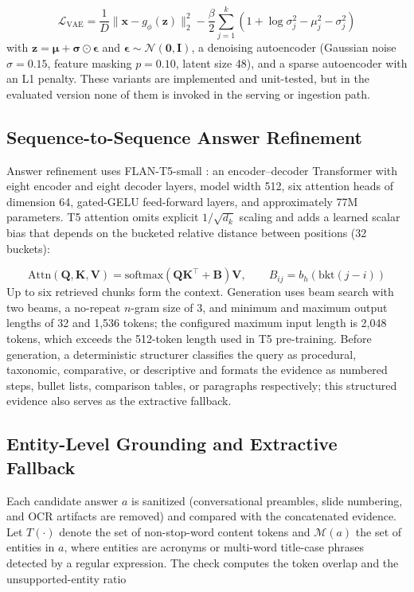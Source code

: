 \documentclass[conference]{IEEEtran}
\renewcommand{\boldsymbol}{\bm}
\begin{document}
\begin{equation}
\mathcal{L}_{\mathrm{VAE}}=\frac{1}{D}\|\mathbf{x}-g_\phi(\mathbf{z})\|_2^2-\frac{\beta}{2}\sum_{j=1}^{k}\left(1+\log\sigma_j^2-\mu_j^2-\sigma_j^2\right)
\label{eq:vae}
\end{equation}
with $\mathbf{z}=\boldsymbol{\mu}+\boldsymbol{\sigma}\odot\boldsymbol{\epsilon}$ and $\boldsymbol{\epsilon}\sim\mathcal{N}(\mathbf{0},\mathbf{I})$, a denoising autoencoder \cite{vincent2008} (Gaussian noise $\sigma=0.15$, feature masking $p=0.10$, latent size 48), and a sparse autoencoder with an L1 penalty. These variants are implemented and unit-tested, but in the evaluated version none of them is invoked in the serving or ingestion path.

\subsection{Sequence-to-Sequence Answer Refinement}
Answer refinement uses FLAN-T5-small \cite{chung2024,raffel2020}: an encoder--decoder Transformer with eight encoder and eight decoder layers, model width 512, six attention heads of dimension 64, gated-GELU feed-forward layers, and approximately 77M parameters. T5 attention omits explicit $1/\sqrt{d_k}$ scaling and adds a learned scalar bias that depends on the bucketed relative distance between positions (32 buckets):

\begin{equation}
\mathrm{Attn}(\mathbf{Q},\mathbf{K},\mathbf{V})=\mathrm{softmax}(\mathbf{Q}\mathbf{K}^{\top}+\mathbf{B})\mathbf{V},\qquad B_{ij}=b_h(\mathrm{bkt}(j-i))
\label{eq:attn}
\end{equation}
Up to six retrieved chunks form the context. Generation uses beam search with two beams, a no-repeat $n$-gram size of 3, and minimum and maximum output lengths of 32 and 1{,}536 tokens; the configured maximum input length is 2{,}048 tokens, which exceeds the 512-token length used in T5 pre-training. Before generation, a deterministic structurer classifies the query as procedural, taxonomic, comparative, or descriptive and formats the evidence as numbered steps, bullet lists, comparison tables, or paragraphs respectively; this structured evidence also serves as the extractive fallback.

\subsection{Entity-Level Grounding and Extractive Fallback}
Each candidate answer $a$ is sanitized (conversational preambles, slide numbering, and OCR artifacts are removed) and compared with the concatenated evidence. Let $T(\cdot)$ denote the set of non-stop-word content tokens and $\mathcal{M}(a)$ the set of entities in $a$, where entities are acronyms or multi-word title-case phrases detected by a regular expression. The check computes the token overlap and the unsupported-entity ratio
\end{document}

